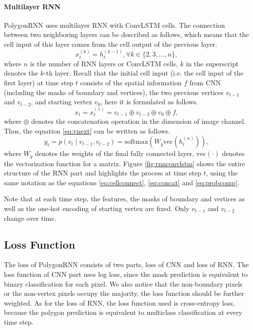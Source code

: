 

\paragraph{Multilayer RNN}
PolygonRNN uses multilayer RNN with ConvLSTM cells. The connection between two neighboring layers can be described as follows, which means that the cell input of this layer comes from the cell output of the previous layer.
\begin{equation}\label{eq:cellconnect}
	x_t^{(k)} = h_t^{(k-1)}, \forall k \in \{2,3,\ldots,n\},
\end{equation}
where $n$ is the number of RNN layers or ConvLSTM cells, $k$ in the superscript denotes the $k$-th layer. Recall that the initial cell input (i.e. the cell input of the first layer) at time step $t$ consists of the spatial information $f$ from CNN (including the masks of boundary and vertices), the two previous vertices $v_{t-1}$ and $v_{t-2}$, and starting vertex $v_0$, here it is formulated as follows.
\begin{equation}\label{eq:concat}
	x_t = x_t^{(1)} = v_{t-1} \oplus v_{t-2} \oplus v_0 \oplus f,
\end{equation}
where $\oplus$ denotes the concatenation operation in the dimension of image channel. Thus, the equation \ref{eq:vnext} can be written as follows.
\begin{equation}\label{eq:probcomp}
	y_t = p(v_t \mid v_{t-1}, v_{t-2}) = \text{softmax}(W_y\text{vec}(h_t^{(n)})),
\end{equation}
where $W_y$ denotes the weights of the final fully connected layer, $\text{vec}(\cdot)$ denotes the vectorization function for a matrix. Figure \ref{fig:rnnconvlstm} shows the entire structure of the RNN part and highlights the process at time step $t$, using the same notation as the equations \ref{eq:cellconnect}, \ref{eq:concat} and \ref{eq:probcomp}.



Note that at each time step, the features, the masks of boundary and vertices as well as the one-hot encoding of starting vertex are fixed. Only $v_{t-1}$ and $v_{t-2}$ change over time.

\subsection{Loss Function}
The loss of PolygonRNN consists of two parts, loss of CNN and loss of RNN. The loss function of CNN part uses log loss, since the mask prediction is equivalent to binary classification for each pixel. We also notice that the non-boundary pixels or the non-vertex pixels occupy the majority, the loss function should be further weighted. As for the loss of RNN, the loss function used is cross-entropy loss, because the polygon prediction is equivalent to multiclass classification at every time step.

